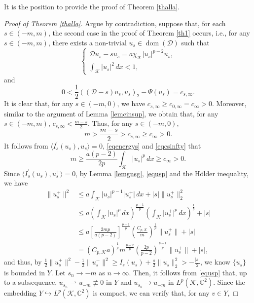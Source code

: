 \documentclass[11pt]{amsart}
\newcommand{\abs}[1]{\lvert#1\rvert}
\newcommand{\norm}[1]{\lVert#1\rVert}
\newcommand{\D}{\mathcal{D}}
\newcommand{\K}{\mathcal{K}}
\numberwithin{equation}{section}
\begin{document}
It is the position to provide the proof of Theorem \ref{thalla}.
\begin{proof}[Proof of Theorem \ref{thalla}]
Argue by contradiction, suppose that, for each $s \in (-m,m)$, the second case in the proof of Theorem \ref{th1} occurs, i.e., for any $s \in (-m,m)$, there exists a non-trivial $u_{s} \in \operatorname{dom}(\D)$ such that
$$
\left\{\begin{array}{l}
\D u_s-su_{s}=a\chi_{\K}\abs{u_{s}}^{p-2} u_{s}, \\
\int_{\K}\abs{u_{s}}^{2} \,dx<1,
\end{array}\right.
$$
and
\begin{equation}\label{eqenergys}
    0<\frac{1}{2}((\D-s) u_{s}, u_{s})_{2}-\Psi(u_{s}) = c_{s,\infty}.
\end{equation}
It is clear that, for any $s \in (-m,0)$, we have $ c_{s,\infty} \geq c_{0,\infty}= c_{\infty}>0$. Moreover, similar to the argument of Lemma \ref{lemcinsup}, we obtain that, for any $s \in (-m,m)$, $ c_{s,\infty}<\frac{m-s}{2}$. Thus, for any $s \in (-m,0)$,
\begin{equation}\label{eqcsinfty}
    m> \frac{m-s}{2} > c_{s,\infty} \geq c_{\infty}>0.
\end{equation}
It follows from $\langle I_{s}^{\prime}(u_{s}), u_{s}\rangle = 0$, \eqref{eqenergys} and \eqref{eqcsinfty} that
\begin{equation}\label{equsp}
    m\geq \frac{a(p-2)}{2p}\int_{\K}\abs{u_{s}}^p\, dx   \geq c_{\infty}>0.
\end{equation}
Since $\langle I_{{s}}^{\prime}(u_{s}), u^+_{s}\rangle = 0$, by Lemma \ref{lemgnsg}, \eqref{equsp} and the H\"older inequality, we have
\begin{equation*}
    \begin{aligned}
    \norm{u^+_{s}}^2  &\leq a\int_{\K}\abs{u_{{s}}}^{p-1}\abs{u_{{s}}^+}\, dx +\abs{s}\norm{u^+_{s}}^2_2 \\
    &\leq a(\int_{\K}\abs{u_{{s}}}^p\, dx)^\frac{p-1}{p}(\int_{\K}\abs{u_{{s}}^+}^p\, dx)^\frac{1}{p}+\abs{s} \\
    &\leq a\left[\frac{2mp }{a(p-2)}\right]^\frac{p-1}{p}\left(\frac{C_{p,\K}}{m}\right)^\frac{1}{p}\norm{u^+_{s}}+\abs{s}\\
    &= (C_{p,\K}a)^\frac{1}{p} m^\frac{p-2}{p}\left(\frac{2p }{p-2}\right)^\frac{p-1}{p}\norm{u^+_{s}}+\abs{s},
    \end{aligned}
\end{equation*}
and thus, by $\frac{1}{2}\norm{u^+_s}^2 - \frac{1}{2}\norm{u^-_s}^2 \geq I_s(u_s)+\frac{s}{2}\norm{u_{s}}^2_2 > -\frac{\abs{s}}{2}$, we know $\{u_s\}$ is bounded in $Y$. Let $s_n\to -m$ as $n\to \infty$. Then, it follows from \eqref{equsp} that, up to a subsequence, $u_{s_n} \rightharpoonup u_{-m}\not\equiv0$ in $Y$ and $u_{s_n} \to u_{-m}$ in $L^p(\K,\mathbb{C}^2)$. Since the embedding $ Y \hookrightarrow L^p(\K,\mathbb{C}^2)$ is compact, we can verify that, for any $v \in Y$,

\end{proof}
\end{document}
